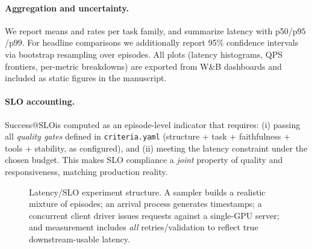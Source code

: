 \documentclass[11pt]{article}
\newcommand{\pninetyfive}{\ensuremath{\mathrm{p95}}}
\newcommand{\pninetynine}{\ensuremath{\mathrm{p99}}}
\newcommand{\slo}{\ensuremath{\mathrm{SLO}}}
\begin{document}
\paragraph{Aggregation and uncertainty.}
We report means and rates per task family, and summarize latency with p50/\pninetyfive/\pninetynine.
For headline comparisons we additionally report 95\% confidence intervals via bootstrap resampling over episodes.
All plots (latency histograms, QPS frontiers, per-metric breakdowns) are exported from W\&B dashboards and included as static figures in the manuscript.

\paragraph{SLO accounting.}
Success@\slo is computed as an episode-level indicator that requires:
(i) passing all \emph{quality gates} defined in \texttt{criteria.yaml} (structure + task + faithfulness + tools + stability, as configured), and
(ii) meeting the latency constraint under the chosen budget.
This makes SLO compliance a \emph{joint} property of quality and responsiveness, matching production reality.

\begin{figure}[t]
\centering
{}
\caption{Latency/SLO experiment structure.
A sampler builds a realistic mixture of episodes; an arrival process generates timestamps; a concurrent client driver issues requests against a single-GPU server; and measurement includes \emph{all} retries/validation to reflect true downstream-usable latency.}
\label{fig:slo-harness}
\end{figure}
\end{document}
